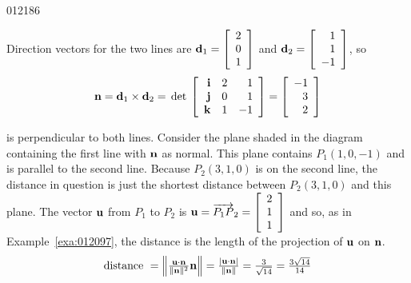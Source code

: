 \begin{example}{}{012186}
\begin{solution}Direction vectors for the two lines are $\textbf{d}_{1} = \left[
\begin{array}{r}
2\\
0\\
1
\end{array}
\right]$
and 
$\textbf{d}_{2} = \left[
\begin{array}{r}
1\\
1\\
-1
\end{array}
\right]$, so
\begin{equation*}
\textbf{n} = \textbf{d}_{1} \times \textbf{d}_{2} = \thinspace\operatorname{det\medspace}\left[
\begin{array}{rrr}
\textbf{i} & 2 & 1\\
\textbf{j} & 0 & 1\\
\textbf{k} & 1 & -1
\end{array}
\right]
= \left[
\begin{array}{r}
-1\\
3\\
2
\end{array}
\right]
\end{equation*}
\begin{wrapfigure}[7]{l}{5cm} 
\vspace*{-2em}
\centering

\end{wrapfigure}

\setlength{\rightskip}{0pt plus 200pt} 
is perpendicular to both lines. Consider the plane shaded in the diagram containing the first line with $\textbf{n}$ as normal. This plane contains $P_{1}(1, 0, -1)$ and is parallel to the second line. Because $P_{2}(3, 1, 0)$ is on the second line, the distance in question is just the shortest distance between $P_{2}(3, 1, 0)$ and this plane. The vector $\textbf{u}$ from $P_{1}$ to $P_{2}$ is $\textbf{u} = \overrightarrow{P_{1}P}_{2} = \left[
\begin{array}{r}
2\\
1\\
1
\end{array}
\right]$
and so, as in Example~\ref{exa:012097}, the distance is the length of the projection of $\textbf{u}$ on $\textbf{n}$.
\begin{equation*}
\mbox{distance }= \left\| \tfrac{\textbf{u} \cdot \textbf{n}}{\| \textbf{n} \|^2}\textbf{n} \right\| = \tfrac{|\textbf{u} \cdot \textbf{n}|}{\| \textbf{n} \|} = \tfrac{3}{\sqrt{14}} = \tfrac{3\sqrt{14}}{14}
\end{equation*}


\end{solution}
\end{example}
